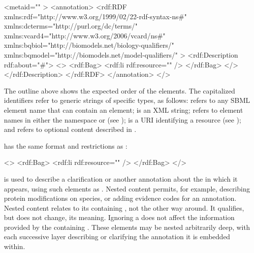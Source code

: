 \vspace*{-0.75ex}
\begin{example}
<\sbmlElement \otherContentTall metaid="\sbmlMetaNS" \otherContentTall>
  \otherContent
  <annotation>
    \otherContent
    <rdf:RDF xmlns:rdf="http://www.w3.org/1999/02/22-rdf-syntax-ns\#"
             xmlns:dcterms="http://purl.org/dc/terms/"
             xmlns:vcard4="http://www.w3.org/2006/vcard/ns\#"
             xmlns:bqbiol="http://biomodels.net/biology-qualifiers/"
             xmlns:bqmodel="http://biomodels.net/model-qualifiers/" >\vspace*{0.75ex}
      <rdf:Description rdf:about="#\sbmlMetaNS">
        \history
        <\relationElementNS>
          <rdf:Bag>
            <rdf:li rdf:resource="\resourceURINS" />
            \moreOfTheSame
            \nestedContent
          </rdf:Bag>
        </\relationElementNS>
        \moreOfTheSame
      </rdf:Description>
      \otherContent
    </rdf:RDF>
    \otherContent
  </annotation>
  \otherContent
</\sbmlElementNS>
\end{example}
\vspace*{-0.75ex}

The outline above shows the expected order of the elements.  The
capitalized identifiers refer to generic strings of specific
types, as follows: \sbmlElement refers to any SBML element name
that can contain an  element; \sbmlMeta is an
XML  string; \relationElement refers to element names
in either the namespace
{}
or {}
(see ); \resourceURI is a
URI identifying a resource (see
); and \history refers to
optional content described in
.

\nestedContent has the same format and restrictions as \relationElement:

\vspace*{-0.75ex}
\begin{example}
  <\relationElementNS>
    <rdf:Bag>
      <rdf:li rdf:resource="\resourceURINS" />
      \moreOfTheSame
      \nestedContent
    </rdf:Bag>
  </\relationElementNS>
\end{example}
\vspace*{-0.75ex}


\nestedContent is used to describe a clarification or another annotation about the \relationElement in which it appears, using such elements as .  Nested content permits, for example, describing protein modifications on species, or adding evidence codes for an annotation.  Nested content relates to its containing \relationElement, not the other way around.  It qualifies, but does not change, its meaning.  Ignoring a \nestedContent does not affect the information provided by the containing \relationElement.  These elements may be nested arbitrarily deep, with each successive layer describing or clarifying the annotation it is embedded within.

